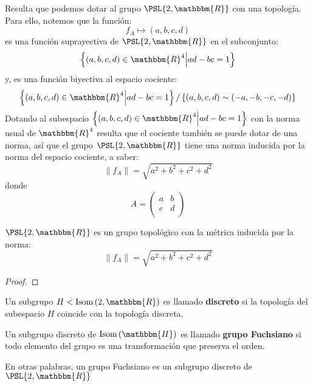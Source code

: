 \documentclass[12pt]{report}
\theoremstyle{largebreak}
\newcommand{\bbm}[1]{\ensuremath{\mathbbm{#1}}}
\newcommand{\norm}[1]{\|#1\|}
\newcommand{\Isom}[1]{\ensuremath{\textup{Isom}\left(#1\right)}}
\begin{document}
    Resulta que podemos dotar al grupo $\PSL{2,\bbm{R}}$ con una topología. Para ello, notemos que la función:
    \begin{equation*}
        f_A\mapsto (a,b,c,d)
    \end{equation*}
    es una función suprayectiva de $\PSL{2,\bbm{R}}$ en el subconjunto:
    \begin{equation*}
        \left\{(a,b,c,d)\in\bbm{R}^4\Big|ad-bc=1 \right\}
    \end{equation*}
    y, es una función biyectiva al espacio cociente:
    \begin{equation*}
        \left\{(a,b,c,d)\in\bbm{R}^4\Big|ad-bc=1 \right\}/\left\{(a,b,c,d)\sim(-a,-b,-c,-d) \right\}
    \end{equation*}
    Dotando al subespacio $\left\{(a,b,c,d)\in\bbm{R}^4\Big|ad-bc=1 \right\}$ con la norma usual de $\bbm{R}^4$ resulta que el cociente también se puede dotar de una norma, así que el grupo $\PSL{2,\bbm{R}}$ tiene una norma inducida por la norma del espacio cociente, a saber:
    \begin{equation*}
        \norm{f_A}=\sqrt{a^2+b^2+c^2+d^2}
    \end{equation*}
    donde
    \begin{equation*}
        A=\left(\begin{array}{cc}
            a & b \\
            c & d \\
        \end{array}\right)
    \end{equation*}

    \begin{propo}
        $\PSL{2,\bbm{R}}$ es un grupo topológico con la métrica inducida por la norma:
        \begin{equation*}
            \norm{f_A}=\sqrt{a^2+b^2+c^2+d^2}
        \end{equation*}
    \end{propo}

    \begin{proof}
    \end{proof}

    \begin{mydef}
        Un subgrupo $H<\Isom{2,\bbm{R}}$ es llamado \textbf{discreto} si la topología del subespacio $H$ coincide con la topología discreta.
    \end{mydef}

    \begin{mydef}
        Un subgrupo discreto de $\Isom{\bbm{H}}$ es llamado \textbf{grupo Fuchsiano} si todo elemento del grupo es una transformación que preserva el orden.

        En otras palabras, un grupo Fuchsiano es un subgrupo discreto de $\PSL{2,\bbm{R}}$
    \end{mydef}
\end{document}

